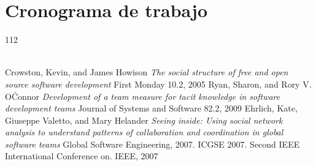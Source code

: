 \documentclass[12pt,titlepage]{report}
\begin{document}
\chapter{Cronograma de trabajo}
\begin {ganttchart}{1}{12}
   \\
   \\
\end {ganttchart}




\begin{thebibliography}{9}
 Crowston, Kevin, and James Howison \textit{The
    social structure of free and open source software development}
  First Monday 10.2, 2005
 Ryan, Sharon, and Rory V.  O\'Connor
  \textit{Development of a team measure for tacit knowledge in
    software development teams} Journal of Systems and Software 82.2,
  2009
Ehrlich, Kate, Giuseppe Valetto, and Mary Helander
  \textit{Seeing inside: Using social network analysis to understand
    patterns of collaboration and coordination in global software
    teams} Global Software Engineering, 2007.  ICGSE 2007.  Second
  IEEE International Conference on.  IEEE, 2007
\end{thebibliography}
\end{document}
